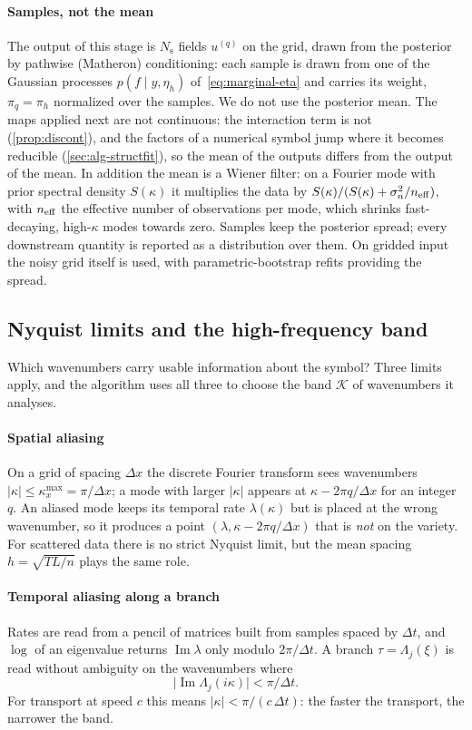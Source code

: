 \documentclass[11pt]{article}
\theoremstyle{plain}
\theoremstyle{definition}
\theoremstyle{remark}
\newcommand{\noise}{\sigma_{n}}             %
\newcommand{\Nsamp}{N_{\mathrm s}}          %
\newcommand{\abs}[1]{\lvert#1\rvert}
\begin{document}
\paragraph{Samples, not the mean}
The output of this stage is $\Nsamp$ fields $u^{(q)}$ on the grid, drawn from the posterior by pathwise
(Matheron) conditioning: each sample is drawn from one of the Gaussian processes $p(f\mid y,\eta_h)$
of~\eqref{eq:marginal-eta} and carries its weight, $\pi_q=\pi_h$ normalized over the samples. We do not use the posterior mean. The maps applied next
are not continuous: the interaction term is not (\cref{prop:discont}), and the factors of a numerical symbol jump
where it becomes reducible (\cref{sec:alg-structfit}), so the mean of the outputs differs from the output of the mean. In addition the mean is a Wiener filter: on a Fourier mode with
prior spectral density $S(\kappa)$ it multiplies the data by $S(\kappa)/(S(\kappa)+\noise^2/n_{\rm eff})$, with $n_{\rm eff}$ the effective number of observations per mode,
which shrinks fast-decaying, high-$\kappa$ modes towards zero. Samples keep the posterior spread;
every downstream quantity is reported as a distribution over them. On gridded input the noisy grid
itself is used, with parametric-bootstrap refits providing the spread.

\subsection{Nyquist limits and the high-frequency band}\label{sec:nyquist}
Which wavenumbers carry usable information about the symbol? Three limits apply, and the algorithm
uses all three to choose the band $\mathcal K$ of wavenumbers it analyses.

\paragraph{Spatial aliasing} On a grid of spacing $\Delta x$ the discrete Fourier transform sees
wavenumbers $\abs{\kappa}\le\kappa_x^{\max}=\pi/\Delta x$; a mode with larger $\abs\kappa$ appears at
$\kappa-2\pi q/\Delta x$ for an integer $q$. An aliased mode keeps its temporal rate $\lambda(\kappa)$
but is placed at the wrong wavenumber, so it produces a point $(\lambda,\kappa-2\pi q/\Delta x)$ that is
\emph{not} on the variety. For scattered data there is no strict Nyquist limit, but the mean spacing
$h=\sqrt{TL/n}$ plays the same role.

\paragraph{Temporal aliasing along a branch} Rates are read from a pencil of matrices built from
samples spaced by $\Delta t$, and $\log$ of an eigenvalue returns $\operatorname{Im}\lambda$ only modulo
$2\pi/\Delta t$. A branch $\tau=\Lambda_j(\xi)$ is read without ambiguity on the wavenumbers where
\begin{equation}\label{eq:nyq-t}
  \abs{\operatorname{Im}\Lambda_j(i\kappa)}<\pi/\Delta t .
\end{equation}
For transport at speed $c$ this means $\abs\kappa<\pi/(c\,\Delta t)$: the faster the transport, the
narrower the band.
\end{document}
